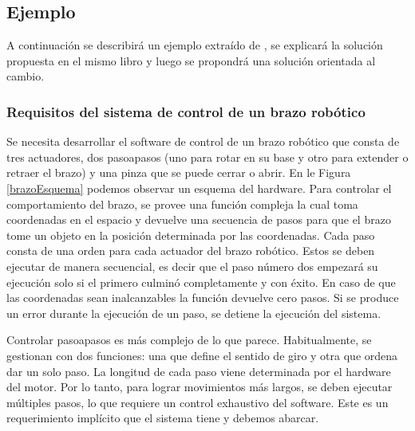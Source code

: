 \subsection*{Ejemplo}

A continuación se describirá un ejemplo extraído de \cite[Sección. 3.4]{douglass}, se explicará la solución propuesta en el mismo libro y luego se propondrá una solución orientada al cambio.

\subsubsection*{Requisitos del sistema de control de un brazo robótico}
\label{requisitos}

Se necesita desarrollar el software de control de un brazo robótico que consta de tres \gls{actuadores}, dos \glspl{pasoapaso} (uno para rotar en su base y otro para extender o retraer el brazo) y una pinza que se puede cerrar o abrir. En le Figura \ref{brazoEsquema} podemos observar un esquema del hardware. Para controlar el comportamiento del brazo, se provee una función compleja la cual toma coordenadas en el espacio y devuelve una secuencia de pasos para que el brazo tome un objeto en la posición determinada por las coordenadas. Cada paso consta de una orden para cada actuador del brazo robótico. Estos se deben ejecutar de manera secuencial, es decir que el paso número dos empezará su ejecución solo si el primero culminó completamente y con éxito. En caso de que las coordenadas sean inalcanzables la función devuelve cero pasos. Si se produce un error durante la ejecución de un paso, se detiene la ejecución del sistema.

Controlar \glspl{pasoapaso} es más complejo de lo que parece. Habitualmente, se gestionan con dos funciones: una que define el sentido de giro y otra que ordena dar un solo paso. La longitud de cada paso viene determinada por el hardware del motor. Por lo tanto, para lograr movimientos más largos, se deben ejecutar múltiples pasos, lo que requiere un control exhaustivo del software. Este es un requerimiento implícito que el sistema tiene y debemos abarcar.

